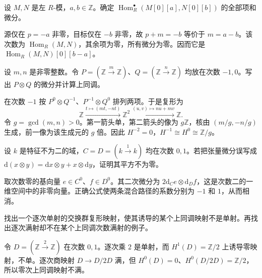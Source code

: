 \begin{exercise}\label{b4:ex:05-hom-support}
设 \(M,N\) 是左 \(R\)-模，\(a,b\in\mathbb Z\)。确定 \(\operatorname{Hom}_R^\bullet(M[0][a],N[0][b])\) 的全部项和微分。
\end{exercise}
\begin{solution}
源仅在 \(p=-a\) 非零，目标仅在 \(-b\) 非零，故 \(p+m=-b\) 等价于 \(m=a-b\)。该次数为 \(\operatorname{Hom}_R(M,N)\)，其余项为零，所有微分为零。因而它是 \(\operatorname{Hom}_R(M,N)[0][b-a]\)。
\end{solution}

\begin{exercise}\label{b4:ex:05-tensor-integers}
设 \(m,n\) 是非零整数。令 \(P=(\mathbb Z\xrightarrow{m}\mathbb Z)\)、\(Q=(\mathbb Z\xrightarrow{n}\mathbb Z)\) 均放在次数 \(-1,0\)。写出 \(P\otimes Q\) 的微分并计算上同调。
\end{exercise}
\begin{solution}
在次数 \(-1\) 按 \(P^0\otimes Q^{-1}\)、\(P^{-1}\otimes Q^0\) 排列两项。于是复形为
\[
\mathbb Z\xrightarrow{t\mapsto(mt,-nt)}\mathbb Z^2
\xrightarrow{(u,v)\mapsto nu+mv}\mathbb Z.
\]
令 \(g=\gcd(m,n)>0\)。第一箭头单，第二箭头的像为 \(g\mathbb Z\)，核由 \((m/g,-n/g)\) 生成，前一像为该生成元的 \(g\) 倍。因此 \(H^{-2}=0\)，\(H^{-1}\cong H^0\cong\mathbb Z/g\)。
\end{solution}

\begin{exercise}\label{b4:ex:05-tensor-wrong-sign}
设 \(k\) 是特征不为二的域，\(C=D=(k\xrightarrow{1}k)\) 均在次数 \(0,1\)。若把张量微分误写成 \(\mathrm{d}(x\otimes y)=\mathrm{d}x\otimes y+x\otimes \mathrm{d}y\)，证明其平方不为零。
\end{exercise}
\begin{solution}
取次数零的基向量 \(e\in C^0\)、\(f\in D^0\)。其二次微分为 \(2\mathrm{d}_Ce\otimes \mathrm{d}_Df\)，这是次数二的一维空间中的非零向量。正确公式使两条混合路径的系数分别为 \(-1\) 和 \(1\)，从而相消。
\end{solution}

\begin{exercise}\label{b4:ex:05-homology-not-mono}
找出一个逐次单射的交换群复形映射，使其诱导的某个上同调映射不是单射。再找出逐次满射却不在某个上同调次数满射的例子。
\end{exercise}
\begin{solution}
令 \(D=(\mathbb Z\xrightarrow{2}\mathbb Z)\) 在次数 \(0,1\)。逐次乘 \(2\) 是单射，而 \(H^1(D)=\mathbb Z/2\) 上诱导零映射，不单。逐次商映射 \(D\to D/2D\) 满，但 \(H^0(D)=0\)、\(H^0(D/2D)=\mathbb Z/2\)，所以零次上同调映射不满。
\end{solution}

